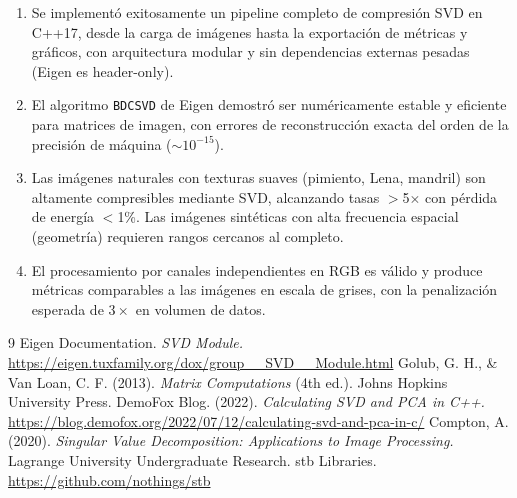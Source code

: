 ﻿\documentclass[12pt,a4paper]{article}
\theoremstyle{definition}
\begin{document}
\begin{enumerate}
    \item Se implement\'{o} exitosamente un pipeline completo de compresi\'{o}n SVD en C++17, desde la carga de im\'{a}genes hasta la exportaci\'{o}n de m\'{e}tricas y gr\'{a}ficos, con arquitectura modular y sin dependencias externas pesadas (Eigen es header-only).

    \item El algoritmo \texttt{BDCSVD} de Eigen demostr\'{o} ser num\'{e}ricamente estable y eficiente para matrices de imagen, con errores de reconstrucci\'{o}n exacta del orden de la precisi\'{o}n de m\'{a}quina ($\sim 10^{-15}$).

    \item Las im\'{a}genes naturales con texturas suaves (pimiento, Lena, mandril) son altamente compresibles mediante SVD, alcanzando tasas $>$5$\times$ con p\'{e}rdida de energ\'{i}a $<$1\%. Las im\'{a}genes sint\'{e}ticas con alta frecuencia espacial (geometr\'{i}a) requieren rangos cercanos al completo.

    \item El procesamiento por canales independientes en RGB es v\'{a}lido y produce m\'{e}tricas comparables a las im\'{a}genes en escala de grises, con la penalizaci\'{o}n esperada de $3\times$ en volumen de datos.
\end{enumerate}

\begin{thebibliography}{9}
 Eigen Documentation. \textit{SVD Module.} \url{https://eigen.tuxfamily.org/dox/group__SVD__Module.html}
 Golub, G. H., \& Van Loan, C. F. (2013). \textit{Matrix Computations} (4th ed.). Johns Hopkins University Press.
 DemoFox Blog. (2022). \textit{Calculating SVD and PCA in C++.} \url{https://blog.demofox.org/2022/07/12/calculating-svd-and-pca-in-c/}
 Compton, A. (2020). \textit{Singular Value Decomposition: Applications to Image Processing.} Lagrange University Undergraduate Research.
 stb Libraries. \url{https://github.com/nothings/stb}
\end{thebibliography}
\end{document}
